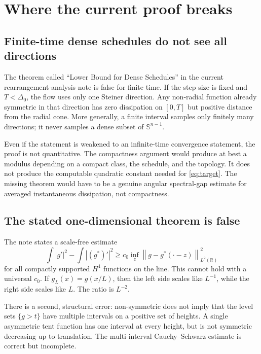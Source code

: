 \documentclass[11pt]{article}
\theoremstyle{definition}
\newcommand{\R}{\mathbb R}
\newcommand{\Sph}{\mathbb S^{n-1}}
\newcommand{\norm}[1]{\left\|#1\right\|}
\begin{document}
\section{Where the current proof breaks}

\subsection{Finite-time dense schedules do not see all directions}

The theorem called ``Lower Bound for Dense Schedules'' in the current
rearrangement-analysis note is false for finite time.  If the step size
is fixed and \(T<\Delta_0\), the flow uses only one Steiner direction.
Any non-radial function already symmetric in that direction has zero
dissipation on \([0,T]\) but positive distance from the radial cone.
More generally, a finite interval samples only finitely many directions;
it never samples a dense subset of \(\Sph\).

Even if the statement is weakened to an infinite-time convergence
statement, the proof is not quantitative.  The compactness argument would
produce at best a modulus depending on a compact class, the schedule, and
the topology.  It does not produce the computable quadratic constant
needed for \eqref{eq:target}.  The missing theorem would have to be a
genuine angular spectral-gap estimate for averaged instantaneous
dissipation, not compactness.

\subsection{The stated one-dimensional theorem is false}

The note states a scale-free estimate
\begin{equation}\label{eq:false-1d}
   \int |g'|^2-\int |(g^*)'|^2
   \ge c_0 \inf_z \norm{g-g^*(\cdot-z)}_{L^2(\R)}^2
\end{equation}
for all compactly supported \(H^1\) functions on the line.  This cannot
hold with a universal \(c_0\).  If \(g_L(x)=g(x/L)\), then the left side
scales like \(L^{-1}\), while the right side scales like \(L\).  The
ratio is \(L^{-2}\).

There is a second, structural error: non-symmetric does not imply that
the level sets \(\{g>t\}\) have multiple intervals on a positive set of
heights.  A single asymmetric tent function has one interval at every
height, but is not symmetric decreasing up to translation.  The
multi-interval Cauchy--Schwarz estimate is correct but incomplete.
\end{document}
